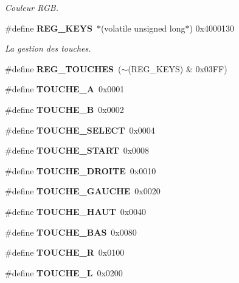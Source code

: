 \begin{DoxyCompactItemize}
\begin{DoxyCompactList}\small\item\em Couleur RGB. \item\end{DoxyCompactList}\item 
\#define {\bf REG\_\-KEYS}~$\ast$(volatile unsigned long$\ast$) 0x4000130\label{main_8h_a583b67102d0dc0ee14a6e23706812838}

\begin{DoxyCompactList}\small\item\em La gestion des touches. \item\end{DoxyCompactList}\item 
\#define {\bfseries REG\_\-TOUCHES}~($\sim$(REG\_\-KEYS) \& 0x03FF)\label{main_8h_a643619e7fb9a1f978756dc2da7390a7d}

\item 
\#define {\bfseries TOUCHE\_\-A}~0x0001\label{main_8h_ac7b2675b691c02c06971fc24accd91d1}

\item 
\#define {\bfseries TOUCHE\_\-B}~0x0002\label{main_8h_a32a5b12463cf637cf7bd221439513882}

\item 
\#define {\bfseries TOUCHE\_\-SELECT}~0x0004\label{main_8h_a7006addcdff657b828ee624945e63776}

\item 
\#define {\bfseries TOUCHE\_\-START}~0x0008\label{main_8h_a9fed50c746d1e63b3382b9340b45f3ea}

\item 
\#define {\bfseries TOUCHE\_\-DROITE}~0x0010\label{main_8h_a850126dd65ffb2cee5210c0a5216d728}

\item 
\#define {\bfseries TOUCHE\_\-GAUCHE}~0x0020\label{main_8h_ae887353b5db4eaf85d0db79f39b92d80}

\item 
\#define {\bfseries TOUCHE\_\-HAUT}~0x0040\label{main_8h_a05db80a8b7f06e2d674678ffc54b1990}

\item 
\#define {\bfseries TOUCHE\_\-BAS}~0x0080\label{main_8h_a83f4b38acc8e8b57b0e15ea3560d0d3c}

\item 
\#define {\bfseries TOUCHE\_\-R}~0x0100\label{main_8h_af0822f307c94b749daf9a0adff26764f}

\item 
\#define {\bfseries TOUCHE\_\-L}~0x0200\label{main_8h_ac9cf01ec0c68aa2c3e77674c51fdf190}


\end{DoxyCompactItemize}
